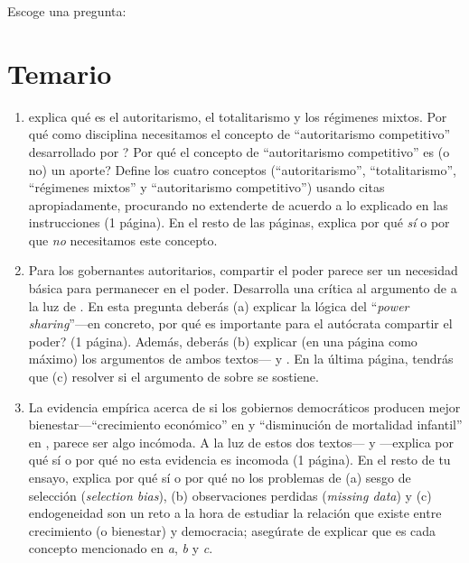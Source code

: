\documentclass[onesided]{article}\usepackage[]{graphicx}\usepackage[]{color}
\begin{document}
Escoge una pregunta:

\section*{Temario}

\begin{enumerate}
	\item \textcite{Linz2000} explica qu\'e es el autoritarismo, el totalitarismo y los r\'egimenes mixtos. Por qu\'e como disciplina necesitamos el concepto de ``autoritarismo competitivo'' desarrollado por \textcite{Levitsky2002}? Por qu\'e el concepto de ``autoritarismo competitivo'' es (o no) un aporte?  Define los cuatro conceptos (``autoritarismo'', ``totalitarismo'', ``r\'egimenes mixtos'' y ``autoritarismo competitivo'') usando citas apropiadamente, procurando no extenderte de acuerdo a lo explicado en las instrucciones (1 p\'agina). En el resto de las p\'aginas, explica por qu\'e \emph{s\'i} o por que \emph{no} necesitamos este concepto. 
  \item Para los gobernantes autoritarios, compartir el poder parece ser un necesidad b\'asica para permanecer en el poder. Desarrolla una cr\'itica al argumento de \textcite{Gandhi:2007et} a la luz de \textcite{Magaloni2008}. En esta pregunta deber\'as (a) explicar la l\'ogica del ``\emph{power sharing}''---en concreto,  por qu\'e es importante para el aut\'ocrata compartir el poder? (1 p\'agina). Adem\'as, deber\'as (b) explicar (en una p\'agina como m\'aximo) los argumentos de ambos textos---\textcite{Gandhi:2007et} y \textcite{Magaloni2008}. En la \'ultima p\'agina, tendr\'as que (c) resolver si el argumento de \textcite{Magaloni2008} sobre \textcite{Gandhi:2007et} se sostiene.
  \item La evidencia emp\'irica acerca de si los gobiernos democr\'aticos producen mejor bienestar---``crecimiento econ\'omico'' en \textcite{Przeworski1993} y ``disminuci\'on de mortalidad infantil'' en \textcite{Ross2006}, parece ser algo inc\'omoda. A la luz de estos dos textos---\textcite{Przeworski1993} y \textcite{Ross2006}---explica por qu\'e s\'i o por qu\'e no esta evidencia es incomoda (1 p\'agina). En el resto de tu ensayo, explica por qu\'e s\'i o por qu\'e no los problemas de (a) sesgo de selecci\'on (\emph{selection bias}), (b) observaciones perdidas (\emph{missing data}) y (c) endogeneidad son un reto a la hora de estudiar la relaci\'on que existe entre crecimiento (o bienestar) y democracia; aseg\'urate de explicar que es cada concepto mencionado en \emph{a}, \emph{b} y \emph{c}.
\end{enumerate}



\newpage
{}
\setcounter{page}{1}
\printbibliography
\end{document}
